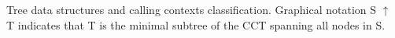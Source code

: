 \label{fig:hcct-venn} Tree data structures and calling contexts classification. Graphical notation S $\uparrow$ T indicates that T is the minimal subtree of the CCT spanning all nodes in S.
